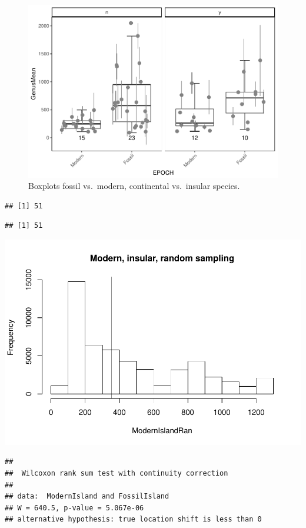 \documentclass[]{article}
\begin{document}
\begin{figure}[htbp]
\centering
\includegraphics{MA_JJ_files/figure-latex/Boxplots fossil vs. modern, continental vs. insular-1.pdf}
\caption{Boxplots fossil vs.~modern, continental vs.~insular species.}
\end{figure}

\begin{verbatim}
## [1] 51
\end{verbatim}

\begin{verbatim}
## [1] 51
\end{verbatim}

\includegraphics{MA_JJ_files/figure-latex/randon sampling modern fossil, island continental-1.pdf}

\begin{verbatim}
## 
##  Wilcoxon rank sum test with continuity correction
## 
## data:  ModernIsland and FossilIsland
## W = 640.5, p-value = 5.067e-06
## alternative hypothesis: true location shift is less than 0
\end{verbatim}
\end{document}
